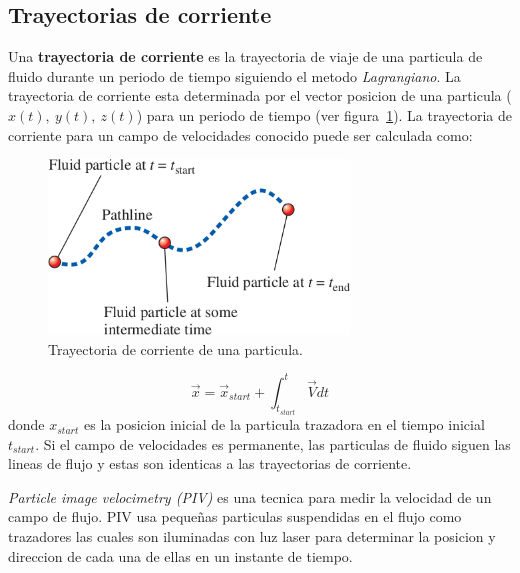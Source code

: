 \documentclass[10pt, oneside]{article}
\begin{document}
\subsection{Trayectorias de corriente}
Una \textbf{trayectoria de corriente} es la trayectoria de viaje de una particula de fluido durante un periodo de tiempo siguiendo el metodo \emph{Lagrangiano}. La trayectoria de corriente esta determinada por el vector posicion de una particula ($x(t),\ y(t),\ z(t)$) para un periodo de tiempo (ver figura~\ref{pathl}). La trayectoria de corriente para un campo de velocidades conocido  puede ser calculada como:
\begin{figure}[h]
\centering
\includegraphics[width=8cm]{pathl}
\caption{Trayectoria de corriente de una particula.}
\label{pathl}
\end{figure}

\begin{equation}
\vec{x} = \vec{x}_{start} + \int_{t_{start}}^t \vec{V} dt
\label{patl}
\end{equation}
donde $x_{start}$ es la posicion inicial de la particula trazadora en el tiempo inicial $t_{start}$. Si el campo de velocidades es permanente, las particulas de fluido siguen las lineas de flujo y estas son identicas a las trayectorias de corriente. 

\emph{Particle image velocimetry (PIV)} es una tecnica para medir la velocidad de un campo de flujo. PIV usa peque\~nas particulas suspendidas en el flujo como trazadores las cuales son iluminadas con luz laser para determinar la posicion y direccion de cada una de ellas en un instante de tiempo.
\end{document}
